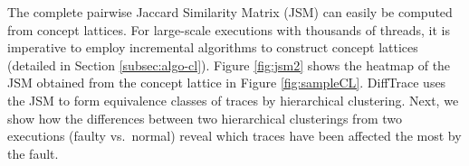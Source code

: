 % 
%

The complete pairwise Jaccard Similarity Matrix (JSM) can easily be computed from concept lattices.
%
For large-scale executions with thousands of threads, it is imperative
to employ incremental algorithms to
construct concept lattices (detailed in Section \ref{subsec:algo-cl}).
%
%
Figure \ref{fig:jsm2}
shows the heatmap
of the JSM obtained from the concept lattice in Figure \ref{fig:sampleCL}.
%
DiffTrace uses the JSM to form equivalence classes of traces by hierarchical clustering.
%
Next, we show how the differences between two hierarchical clusterings from two executions
(faulty vs.~normal) reveal which traces have been affected the most by the fault.


